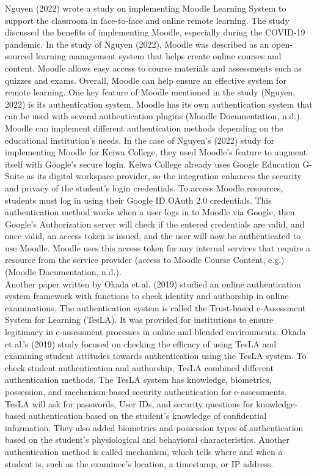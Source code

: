 \documentclass{icsthesis}
\begin{document}
\begin{mainmatter}
\indent Nguyen (2022) wrote a study on implementing Moodle Learning System to support the classroom in face-to-face and online remote learning. The study discussed the benefits of implementing Moodle, especially during the COVID-19 pandemic. In the study of Nguyen (2022), Moodle was described as an open-sourced learning management system that helps create online courses and content. Moodle allows easy access to course materials and assessments such as quizzes and exams. Overall, Moodle can help ensure an effective system for remote learning. One key feature of Moodle mentioned in the study (Nguyen, 2022) is its authentication system. Moodle has its own authentication system that can be used with several authentication plugins (Moodle Documentation, n.d.). Moodle can implement different authentication methods depending on the educational institution's needs. In the case of Nguyen's (2022) study for implementing Moodle for Keiwa College, they used Moodle's feature to augment itself with Google's secure login. Keiwa College already uses Google Education G-Suite as its digital workspace provider, so the integration enhances the security and privacy of the student's login credentials. To access Moodle resources, students must log in using their Google ID OAuth 2.0 credentials. This authentication method works when a user logs in to Moodle via Google, then Google's Authorization server will check if the entered credentials are valid, and once valid, an access token is issued, and the user will now be authenticated to use Moodle. Moodle uses this access token for any internal services that require a resource from the service provider (access to Moodle Course Content, e.g.) (Moodle Documentation, n.d.).\\

\indent Another paper written by Okada et al. (2019) studied an online authentication system framework with functions to check identity and authorship in online examinations. The authentication system is called the Trust-based e-Assessment System for Learning (TesLA). It was provided for institutions to ensure legitimacy in e-assessment processes in online and blended environments. Okada et al.'s (2019) study focused on checking the efficacy of using TesLA and examining student attitudes towards authentication using the TesLA system. To check student authentication and authorship, TesLA combined different\\
authentication methods. The TesLA system has knowledge, biometrics, possession, and mechanism-based security authentication for e-assessments. TesLA will ask for passwords, User IDs, and security questions for knowledge-based authentication based on the student's knowledge of confidential information. They also added biometrics and possession types of authentication based on the student's physiological and behavioral characteristics. Another authentication method is called mechanism, which tells where and when a student is, such as the examinee's location, a timestamp, or IP address.\\


\end{mainmatter}
\end{document}
